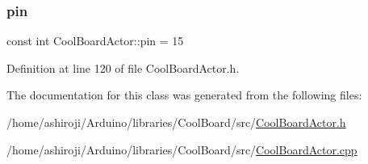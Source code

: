 \mbox{\label{class_cool_board_actor_a8b5c0b41fe6033b68d9e1ed00bc2e122}} 
\subsubsection{\texorpdfstring{pin}{pin}}
{\footnotesize\ttfamily const int Cool\+Board\+Actor\+::pin = 15\hspace{0.3cm}{\ttfamily [private]}}



Definition at line 120 of file Cool\+Board\+Actor.\+h.



The documentation for this class was generated from the following files\+:\begin{DoxyCompactItemize}
\item 
/home/ashiroji/\+Arduino/libraries/\+Cool\+Board/src/\hyperlink{_cool_board_actor_8h}{Cool\+Board\+Actor.\+h}\item 
/home/ashiroji/\+Arduino/libraries/\+Cool\+Board/src/\hyperlink{_cool_board_actor_8cpp}{Cool\+Board\+Actor.\+cpp}\end{DoxyCompactItemize}
